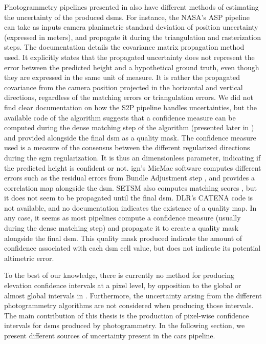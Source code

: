 Photogrammetry pipelines presented in  also have different methods of estimating the uncertainty of the produced \acrshort{dsm}s. For instance, the NASA's ASP pipeline can take as inputs camera planimetric standard deviation of position uncertainty (expressed in meters), and propagate it during the triangulation and rasterization steps. The documentation \cite{nasa_ames_2020} details the covariance matrix propagation method used. It explicitly states that the propagated uncertainty does not represent the error between the predicted height and a hypothetical ground truth, even though they are expressed in the same unit of measure. It is rather the propagated covariance from the camera position projected in the horizontal and vertical directions, regardless of the matching errors or triangulation errors. We did not find clear documentation on how the S2P pipeline handles uncertainties, but the available code of the algorithm suggests that a confidence measure can be computed during the dense matching step of the algorithm (presented later in ) and provided alongside the final \acrshort{dsm} as a quality mask. The confidence measure used is a measure of the consensus between the different regularized directions during the \acrshort{sgm} regularization. It is thus an dimensionless parameter, indicating if the predicted height is confident or not.  \acrshort{ign}'s MicMac software computes different errors such as the residual errors from Bundle Adjustment step \cite{ign_micmac_2022}, and provides a correlation map alongside the \acrshort{dsm}. SETSM also computes matching scores \cite{noh_surface_2017}, but it does not seem to be propagated until the final \acrshort{dsm}. DLR's CATENA code is not available, and no documentation indicates the existence of a quality map. In any case, it seems as most pipelines compute a confidence measure (usually during the dense matching step) and propagate it to create a quality mask alongside the final \acrshort{dsm}. This quality mask produced indicate the amount of confidence associated with each \acrshort{dsm} cell value, but does not indicate its potential altimetric error. 

To the best of our knowledge, there is currently no method for producing elevation confidence intervals at a pixel level, by opposition to the global or almost global intervals in \cite{oksanen_digital_2006,wang_robust_2015,hugonnet_uncertainty_2022}. Furthermore, the uncertainty arising from the different photogrammetry algorithms are not considered when producing those intervals. The main contribution of this thesis is the production of pixel-wise confidence intervals for \acrshort{dsm}s produced by photogrammetry. In the following section, we present different sources of uncertainty present in the \acrshort{cars} pipeline. 

